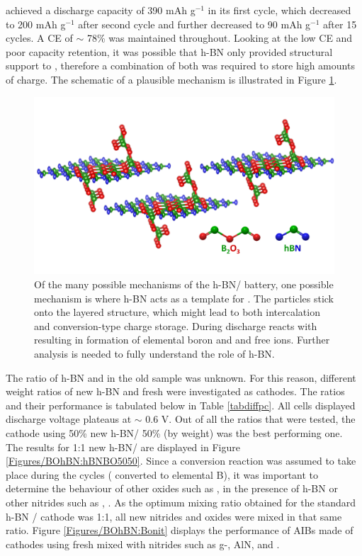  achieved a discharge capacity of 390 mAh g$^{-1}$ in its first cycle, which decreased to 200 mAh g$^{-1}$ after second cycle and further decreased to 90 mAh g$^{-1}$ after 15 cycles. A CE of $\sim$ 78\% was maintained throughout. Looking at the low CE and poor capacity retention, it was possible that h-BN only provided structural support to , therefore a combination of both was required to store high amounts of charge. The schematic of a plausible mechanism is illustrated in Figure \ref{Figures/BOhBN:BonhBN}.  

\begin{figure}[tbh!]
\centering
\includegraphics[width=\textwidth]{Figures/BOhBN/BonhBN}
\caption{Of the many possible mechanisms of the h-BN/ battery, one possible mechanism is where h-BN acts as a template for . The  particles stick onto the layered structure, which might lead to both intercalation and conversion-type charge storage. During discharge  reacts with  resulting in formation of elemental boron and  and free  ions. Further analysis is needed to fully understand the role of h-BN.}
\label{Figures/BOhBN:BonhBN}
\end{figure}

The ratio of h-BN and  in the old sample was unknown. For this reason, different weight ratios of new h-BN and fresh  were investigated as cathodes. The ratios and their performance is tabulated below in Table \ref{tabdiffpc}. All cells displayed discharge voltage plateaus at $\sim$ 0.6 V. Out of all the ratios that were tested, the cathode using 50\% new h-BN/ 50\%  (by weight) was the best performing one. The results for 1:1 new h-BN/ are displayed in Figure \ref{Figures/BOhBN:hBNBO5050}. Since a conversion reaction was assumed to take place during the cycles ( converted to elemental B), it was important to determine the behaviour of other oxides such as ,  in the presence of h-BN or other nitrides such as , . As the optimum mixing ratio obtained for the standard h-BN / cathode was 1:1, all new nitrides and oxides were mixed in that same ratio. Figure \ref{Figures/BOhBN:Bonit} displays the performance of AIBs made of cathodes using fresh  mixed with nitrides such as g-, AlN, and  . 

